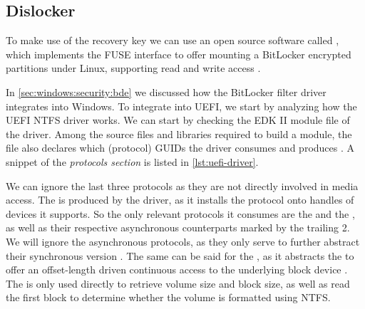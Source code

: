 \subsection{Dislocker}

To make use of the recovery key we can use an open source software called , which implements the \ac{FUSE} interface to offer mounting a BitLocker encrypted partitions under Linux, supporting read and write access \cite{dislocker}.

In \autoref{sec:windows:security:bde} we discussed how the BitLocker filter driver integrates into Windows.
To integrate  into \ac{UEFI}, we start by analyzing how the \ac{UEFI} \ac{NTFS} driver works.
We can start by checking the \ac{EDK} II module file of the driver.
Among the source files and libraries required to build a module, the file also declares which (protocol) \acp{GUID} the driver consumes and produces \cite{tianocore-edk2-module-writer-s-guide}.
A snippet of the \emph{protocols section} is listed in \autoref{lst:uefi-driver}.

\vspace{1em}



We can ignore the last three protocols as they are not directly involved in media access.
The  is produced by the driver, as it installs the protocol onto handles of devices it supports.
So the only relevant protocols it consumes are the  and the , as well as their respective asynchronous counterparts marked by the trailing 2.
We will ignore the asynchronous protocols, as they only serve to further abstract their synchronous version \cite[Sections 13.8 and 13.10]{uefi-spec}.
The same can be said for the , as it abstracts the  to offer an offset-length driven continuous access to the underlying block device \cite[Section 13.7]{uefi-spec}.
The  is only used directly to retrieve volume size and block size, as well as read the first block to determine whether the volume is formatted using \ac{NTFS}.

